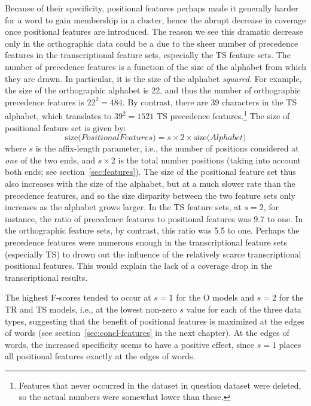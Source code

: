 {Because of their specificity, positional features perhaps made it generally harder for a word to gain membership in a cluster, hence the abrupt decrease in coverage once positional features are introduced. The reason we see this dramatic decrease only in the orthographic data could be a due to the sheer number of precedence features in the transcriptional feature sets, especially the TS feature sets. 
The number of precedence features is a function of the size of the alphabet from which they are drawn. 
%
In particular, it is the size of the alphabet \emph{squared}. For example, the size of the orthographic alphabet is 22, and thus the number of orthographic precedence features is $22^2 = 484$. By contrast, there are 39 characters in the TS alphabet, which translates to $39^2 = 1521$ TS precedence features.\footnote{Features that never occurred in the dataset in question dataset were deleted, so the actual numbers were somewhat lower than these.}
The size of positional feature set is given by: 
\begin{equation*}
\text{size(}{PositionalFeatures}\text{)} = s \times 2 \times \text{size(}{Alphabet}\text{)}
\end{equation*}
where $s$ is the affix-length parameter, i.e., the number of positions considered at \emph{one} of the two ends, and $s \times 2$ is the total number positions (taking into account both ends; see section~\ref{sec:features}). The size of the positional feature set thus also increases with the size of the alphabet, but at a much slower rate than the precedence features, and so the size disparity between the two feature sets only increases as the alphabet grows larger.
In the TS feature sets, at $s =2$, for instance, the ratio of precedence features to positional features was 9.7 to one. In the orthographic feature sets, by contrast, this ratio was 5.5 to one.
Perhaps the precedence features were numerous enough in the transcriptional feature sets (especially TS) to drown out the influence of the relatively scarce transcriptional positional features. This would explain the lack of a coverage drop in the transcriptional results.

The highest F-scores tended to occur at $s=1$ for the O models and $s=2$ for the TR and TS models, i.e., at the lowest non-zero $s$ value for each of the three data types, suggesting that the benefit of positional features is maximized at the edges of words (see section~\ref{sec:concl-features} in the next chapter).
At the edges of words, the increased specificity seems to have a positive effect, since $s=1$ places all positional features exactly at the edges of words.

}
